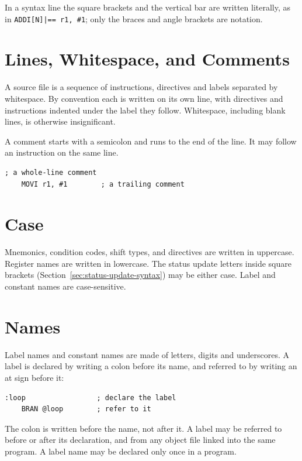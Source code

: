 In a syntax line the square brackets and the vertical bar are written literally, as in \texttt{ADDI[N]|== r1, \#1};
only the braces and angle brackets are notation.

\section{Lines, Whitespace, and Comments}

A source file is a sequence of instructions, directives and labels separated by whitespace. By convention each is
written on its own line, with directives and instructions indented under the label they follow. Whitespace, including
blank lines, is otherwise insignificant.

A comment starts with a semicolon and runs to the end of the line. It may follow an instruction on the same line.

\begin{lstlisting}
; a whole-line comment
    MOVI r1, #1        ; a trailing comment
\end{lstlisting}

\section{Case}

Mnemonics, condition codes, shift types, and directives are written in uppercase. Register names are written in
lowercase. The status update letters inside square brackets (Section~\ref{sec:status-update-syntax}) may be either
case. Label and constant names are case-sensitive.

\section{Names}
\label{sec:names}

Label names and constant names are made of letters, digits and underscores. A label is declared by writing a colon
before its name, and referred to by writing an at sign before it:

\begin{lstlisting}
:loop                 ; declare the label
    BRAN @loop        ; refer to it
\end{lstlisting}

The colon is written before the name, not after it. A label may be referred to before or after its declaration, and
from any object file linked into the same program. A label name may be declared only once in a program.


